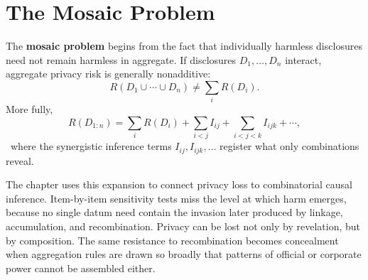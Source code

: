 
\chapter{The Mosaic Problem}
\label{ch:ch030}

The \textbf{mosaic problem} begins from the fact that individually harmless disclosures need not remain harmless in aggregate. If disclosures \(D_1,\ldots,D_n\) interact, aggregate privacy risk is generally nonadditive:
\[
R(D_1\cup\cdots\cup D_n) \neq \sum_i R(D_i).
\]
More fully,
\[
R(D_{1:n}) = \sum_i R(D_i) + \sum_{i<j} I_{ij} + \sum_{i<j<k} I_{ijk} + \cdots,
\]
\ToyModel\ where the synergistic inference terms \(I_{ij}, I_{ijk}, \ldots\) register what only combinations reveal.

The chapter uses this expansion to connect privacy loss to combinatorial causal inference. Item-by-item sensitivity tests miss the level at which harm emerges, because no single datum need contain the invasion later produced by linkage, accumulation, and recombination. Privacy can be lost not only by revelation, but by composition. The same resistance to recombination becomes concealment when aggregation rules are drawn so broadly that patterns of official or corporate power cannot be assembled either.
